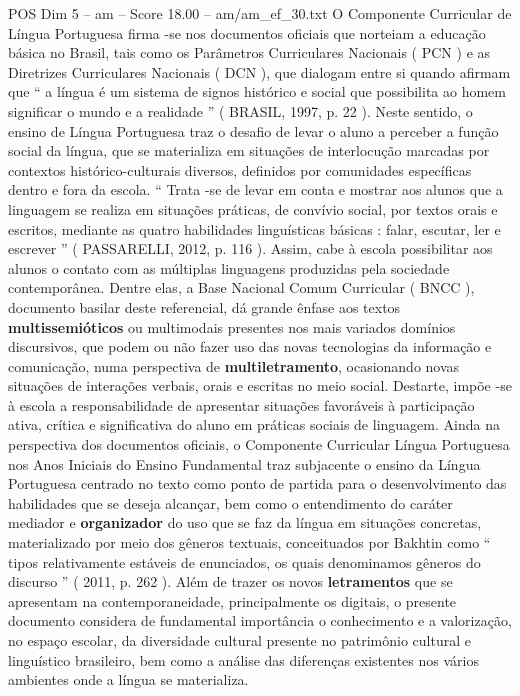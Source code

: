 \begin{textsample}{POS Dim 5 – am – Score 18.00 – am/am\_ef\_30.txt}  \label{ex:f5_pos_061}
O Componente Curricular de Língua Portuguesa firma -se nos documentos oficiais que norteiam a educação básica no Brasil, tais como os Parâmetros Curriculares Nacionais ( PCN ) e as Diretrizes Curriculares Nacionais ( DCN ), que dialogam entre si quando afirmam que “ a língua é um sistema de signos histórico e social que possibilita ao homem significar o mundo e a realidade ” ( BRASIL, 1997, p. 22 ).
Neste sentido, o ensino de Língua Portuguesa traz o desafio de levar o aluno a perceber a função social da língua, que se materializa em situações de interlocução marcadas por contextos histórico-culturais diversos, definidos por comunidades específicas dentro e fora da escola. “ Trata -se de levar em conta e mostrar aos alunos que a linguagem se realiza em situações práticas, de convívio social, por textos orais e escritos, mediante as quatro habilidades linguísticas básicas : falar, escutar, ler e escrever ” ( PASSARELLI, 2012, p. 116 ).
Assim, cabe à escola possibilitar aos alunos o contato com as múltiplas linguagens produzidas pela sociedade contemporânea.
Dentre elas, a Base Nacional Comum Curricular ( BNCC ), documento basilar deste referencial, dá grande ênfase aos textos \textbf{multissemióticos} ou multimodais presentes nos mais variados domínios discursivos, que podem ou não fazer uso das novas tecnologias da informação e comunicação, numa perspectiva de \textbf{multiletramento}, ocasionando novas situações de interações verbais, orais e escritas no meio social.
Destarte, impõe -se à escola a responsabilidade de apresentar situações favoráveis à participação ativa, crítica e significativa do aluno em práticas sociais de linguagem.
Ainda na perspectiva dos documentos oficiais, o Componente Curricular Língua Portuguesa nos Anos Iniciais do Ensino Fundamental traz subjacente o ensino da Língua Portuguesa centrado no texto como ponto de partida para o desenvolvimento das habilidades que se deseja alcançar, bem como o entendimento do caráter mediador e \textbf{organizador} do uso que se faz da língua em situações concretas, materializado por meio dos gêneros textuais, conceituados por Bakhtin como “ tipos relativamente estáveis de enunciados, os quais denominamos gêneros do discurso ” ( 2011, p. 262 ).
Além de trazer os novos \textbf{letramentos} que se apresentam na contemporaneidade, principalmente os digitais, o presente documento considera de fundamental importância o conhecimento e a valorização, no espaço escolar, da diversidade cultural presente no patrimônio cultural e linguístico brasileiro, bem como a análise das diferenças existentes nos vários ambientes onde a língua se materializa.

\end{textsample}
